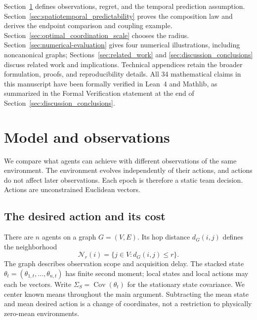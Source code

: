 \documentclass[11pt]{article}
\begin{document}
Section~\ref{sec:model} defines observations, regret, and the temporal
prediction assumption. Section~\ref{sec:spatiotemporal_predictability}
proves the composition law and derives the endpoint comparison and coupling
example. Section~\ref{sec:optimal_coordination_scale} chooses the radius.
Section~\ref{sec:numerical-evaluation} gives four numerical illustrations,
including noncanonical graphs; Sections~\ref{sec:related_work} and
\ref{sec:discussion_conclusions} discuss related work and implications.
Technical appendices retain the broader formulation, proofs, and
reproducibility details. All 34 mathematical claims in this manuscript have been formally verified in Lean~4 and Mathlib, as summarized in the Formal Verification statement at the end of Section~\ref{sec:discussion_conclusions}.

\section{Model and observations}
\label{sec:model}

We compare what agents can achieve with different observations of the same
environment. The environment evolves independently of their actions, and
actions do not affect later observations. Each epoch is therefore a static
team decision. Actions are unconstrained Euclidean vectors.

\subsection{The desired action and its cost}
\label{subsec:decision_model}

There are $n$ agents on a graph $G=(V,E)$. Its hop distance
$d_G(i,j)$ defines the neighborhood
\begin{equation}
\mathcal N_r(i)=\{j\in V:d_G(i,j)\le r\}.
\label{eq:r_neighborhood}
\end{equation}
The graph describes observation scope and acquisition delay. The stacked
state $\theta_t=(\theta_{1,t},\ldots,\theta_{n,t})$ has finite second
moment; local states and local actions may each be vectors. Write
$\Sigma_S=\operatorname{Cov}(\theta_t)$ for the stationary state covariance.
We center known means throughout the main argument. Subtracting the mean
state and mean desired action is a change of coordinates, not a restriction
to physically zero-mean environments.
\end{document}
